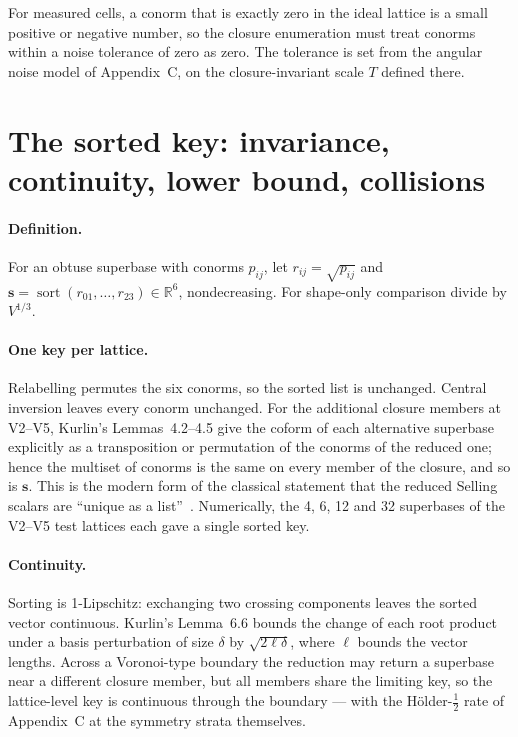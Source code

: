 \documentclass[11pt]{article}
\newcommand{\sortkey}{\mathbf{s}}
\begin{document}
For measured cells, a conorm that is exactly zero in the ideal lattice is a small positive or negative number, so the closure enumeration must treat conorms within a noise tolerance of zero as zero. The tolerance is set from the angular noise model of Appendix~C, on the closure-invariant scale $T$ defined there.

\section{The sorted key: invariance, continuity, lower bound, collisions}
\label{app:key}

\paragraph{Definition.}
For an obtuse superbase with conorms $p_{ij}$, let $r_{ij}=\sqrt{p_{ij}}$ and $\sortkey=\operatorname{sort}(r_{01},\dots,r_{23})\in\mathbb R^6$, nondecreasing. For shape-only comparison divide by $V^{1/3}$.

\paragraph{One key per lattice.}
Relabelling permutes the six conorms, so the sorted list is unchanged. Central inversion leaves every conorm unchanged. For the additional closure members at V2--V5, Kurlin's Lemmas~4.2--4.5 give the coform of each alternative superbase explicitly as a transposition or permutation of the conorms of the reduced one; hence the multiset of conorms is the same on every member of the closure, and so is $\sortkey$. This is the modern form of the classical statement that the reduced Selling scalars are ``unique as a list''~\cite{bravais1850,delone1932,abs2019}. Numerically, the 4, 6, 12 and 32 superbases of the V2--V5 test lattices each gave a single sorted key.

\paragraph{Continuity.}
Sorting is 1-Lipschitz: exchanging two crossing components leaves the sorted vector continuous. Kurlin's Lemma~6.6 bounds the change of each root product under a basis perturbation of size $\delta$ by $\sqrt{2\ell\delta}$, where $\ell$ bounds the vector lengths. Across a Voronoi-type boundary the reduction may return a superbase near a different closure member, but all members share the limiting key, so the lattice-level key is continuous through the boundary --- with the H\"older-$\tfrac12$ rate of Appendix~C at the symmetry strata themselves.
\end{document}
